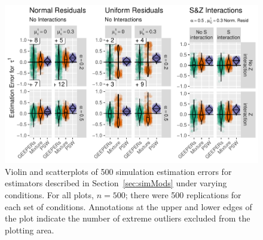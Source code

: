 \documentclass[11pt]{article} %
\begin{document}
\begin{figure}
  \centering
  \includegraphics{../simFigs/boxplots.pdf}
  \caption{Violin and scatterplots of 500 simulation estimation errors for estimators described in Section~\ref{sec:simMods} under varying conditions. For all plots, $n=500$; there were 500 replications for each set of conditions. Annotations at the upper and lower edges of the plot indicate the number of extreme outliers excluded from the plotting area.}
  \label{fig:boxplots}
\end{figure}
\end{document}

